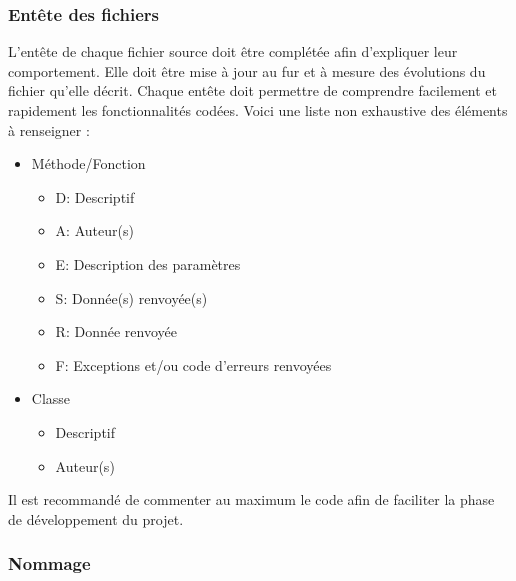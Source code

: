 \documentclass[10pt,a4paper]{article}
\begin{document}
\subsubsection{Entête des fichiers}
L'entête de chaque fichier source doit être complétée afin d'expliquer leur comportement. Elle doit être mise à jour au fur et à mesure des évolutions du fichier qu'elle décrit.
Chaque entête doit permettre de comprendre facilement et rapidement les fonctionnalités codées.
Voici une liste non exhaustive des éléments à renseigner :
\begin{itemize}
\item Méthode/Fonction
\begin{itemize} 
	\renewcommand{\labelitemii}{$\cdot$}
	\item D: Descriptif
	\item A: Auteur(s)
	\item E: Description des paramètres
	\item S: Donnée(s) renvoyée(s)
	\item R: Donnée renvoyée
	\item F: Exceptions et/ou code d'erreurs renvoyées
\end{itemize}
\item Classe
\begin{itemize} 
	\renewcommand{\labelitemii}{$\cdot$} 
	\item Descriptif
	\item Auteur(s)
\end{itemize}
\end{itemize}

Il est recommandé de commenter au maximum le code afin de faciliter la phase de développement du projet.

\subsubsection{Nommage}
\end{document}
